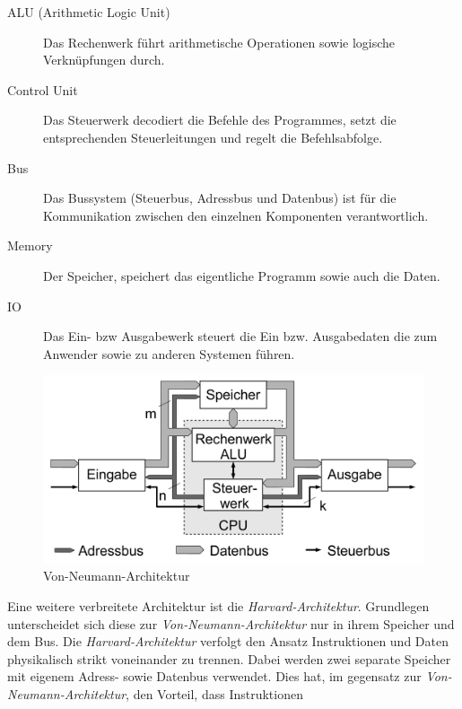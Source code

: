             \begin{description}
                \item[ALU (Arithmetic Logic Unit)] Das Rechenwerk führt arithmetische Operationen sowie logische Verknüpfungen durch. 
                \item[Control Unit] Das Steuerwerk decodiert die Befehle des Programmes,
                setzt die entsprechenden Steuerleitungen und regelt die Befehlsabfolge.
                \item[Bus] Das Bussystem (Steuerbus, Adressbus und Datenbus) ist für die Kommunikation zwischen den einzelnen
                Komponenten verantwortlich.
                \item[Memory] Der Speicher, speichert das eigentliche Programm sowie auch die Daten.
                \item[IO] Das Ein- bzw Ausgabewerk steuert die Ein bzw. Ausgabedaten die zum Anwender sowie zu anderen Systemen führen.
            \end{description}
            \begin{figure}[H]
                \centering
                \includegraphics[scale=0.2]{img/vonneumann.png}
                \caption[Von-Neumann-Architektur]{Von-Neumann-Architektur \cite{von-neumann-architektur}}
                \label{fig:vonneumann}
            \end{figure}
            Eine weitere verbreitete Architektur ist die \textit{Harvard-Architektur}.
            Grundlegen unterscheidet sich diese zur \textit{Von-Neumann-Architektur}
            nur in ihrem Speicher und dem Bus. Die \textit{Harvard-Architektur} verfolgt den Ansatz
            Instruktionen und Daten physikalisch strikt voneinander zu trennen.
            Dabei werden zwei separate Speicher mit eigenem Adress- sowie Datenbus verwendet.
            Dies hat, im gegensatz zur \textit{Von-Neumann-Architektur}, den Vorteil, dass Instruktionen
